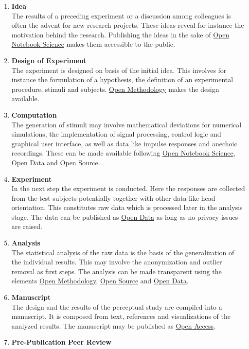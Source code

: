 \documentclass[a4paper, 10pt, twocolumn]{article}
\begin{document}
\begin{enumerate}
\item \textbf{Idea}\\
The results of a preceding experiment or a discussion among colleagues is often the advent 
for new research projects. These ideas reveal for instance the motivation behind the research. 
Publishing the ideas in the sake of \underline{Open Notebook Science} makes them accessible 
to the public.
%
\item \textbf{Design of Experiment}\\
The experiment is designed on basis of the initial idea. This involves for instance the formulation 
of a hypothesis, the definition of an experimental procedure, stimuli and subjects. \underline{Open Methodology} 
makes the design available.
%
\item\textbf{Computation}\\
The generation of stimuli may involve mathematical deviations for numerical simulations, the 
implementation of signal processing, control logic and graphical user interface, as well as data like impulse responses and anechoic recordings. These
can be made available following \underline{Open Notebook Science}, \underline{Open Data} and \underline{Open Source}.
%
\item \textbf{Experiment}\\
In the next step the experiment is conducted. Here the responses are collected from the test subjects potentially 
together with other data like head orientation. This constitutes raw data which is processed later in the analysis stage. 
The data can be published as \underline{Open Data} as long as no privacy issues are raised.
%
\item \textbf{Analysis}\\
The statistical analysis of the raw data is the basis of the generalization of the individual results. This may
involve the anonymization and outlier removal as first steps. The analysis can be made transparent using the elements
\underline{Open Methodology}, \underline{Open Source} and \underline{Open Data}.
%
\item \textbf{Manuscript}\\
The design and the results of the perceptual study are compiled into a manuscript. It is composed
from text, references and visualizations of the analyzed results. The manuscript may be published 
as \underline{Open Access}.
%
\item \textbf{Pre-Publication Peer Review}\\

\end{enumerate}
\end{document}
